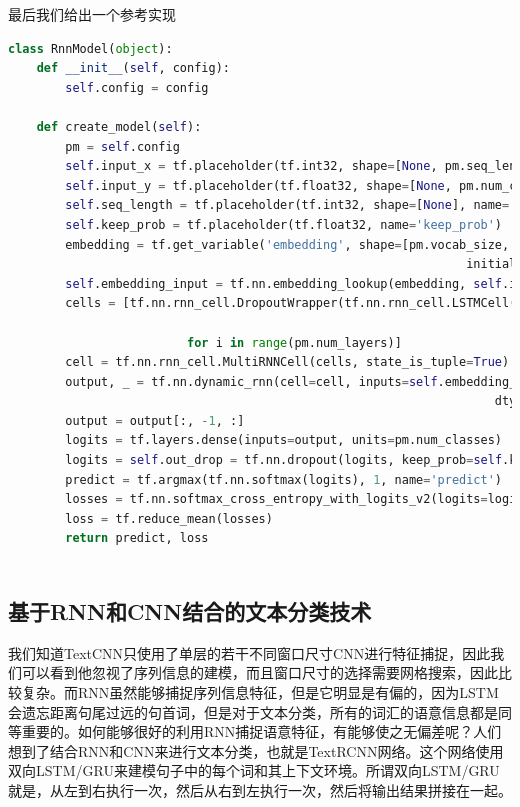 \documentclass[twoside,a4paper,12pt]{book}%
\begin{document}
最后我们给出一个参考实现
\begin{lstlisting}[language={python}]
class RnnModel(object):
	def __init__(self, config):
		self.config = config

	def create_model(self):
		pm = self.config
		self.input_x = tf.placeholder(tf.int32, shape=[None, pm.seq_length], name='input_x')
		self.input_y = tf.placeholder(tf.float32, shape=[None, pm.num_classes], name='input_y')
		self.seq_length = tf.placeholder(tf.int32, shape=[None], name='sequen_length')
		self.keep_prob = tf.placeholder(tf.float32, name='keep_prob')
		embedding = tf.get_variable('embedding', shape=[pm.vocab_size, pm.embedding_dim],
																initializer=tf.constant_initializer(pm.pre_trianing))
		self.embedding_input = tf.nn.embedding_lookup(embedding, self.input_x)
		cells = [tf.nn.rnn_cell.DropoutWrapper(tf.nn.rnn_cell.LSTMCell(num_units=pm.hidden_dim,name='cell-'+str(i)),
																					 output_keep_prob=self.keep_prob)
						 for i in range(pm.num_layers)]
		cell = tf.nn.rnn_cell.MultiRNNCell(cells, state_is_tuple=True)
		output, _ = tf.nn.dynamic_rnn(cell=cell, inputs=self.embedding_input, sequence_length=self.seq_length,
																	dtype=tf.float32)
		output = output[:, -1, :]
		logits = tf.layers.dense(inputs=output, units=pm.num_classes)
		logits = self.out_drop = tf.nn.dropout(logits, keep_prob=self.keep_prob)
		predict = tf.argmax(tf.nn.softmax(logits), 1, name='predict')
		losses = tf.nn.softmax_cross_entropy_with_logits_v2(logits=logits, labels=self.input_y)
		loss = tf.reduce_mean(losses)
		return predict, loss
	
\end{lstlisting}

\subsection{基于RNN和CNN结合的文本分类技术}
我们知道TextCNN只使用了单层的若干不同窗口尺寸\gls{CNN}进行特征捕捉，因此我们可以看到他忽视了序列信息的建模，而且窗口尺寸的选择需要网格搜索，因此比较复杂。而\gls{RNN}虽然能够捕捉序列信息特征，但是它明显是有偏的，因为\gls{LSTM}会遗忘距离句尾过远的句首词，但是对于文本分类，所有的词汇的语意信息都是同等重要的。如何能够很好的利用\gls{RNN}捕捉语意特征，有能够使之无偏差呢？人们想到了结合\gls{RNN}和\gls{CNN}来进行文本分类，也就是TextRCNN网络。这个网络使用双向\gls{LSTM}/\gls{GRU}来建模句子中的每个词和其上下文环境。所谓双向\gls{LSTM}/\gls{GRU} 就是，从左到右执行一次，然后从右到左执行一次，然后将输出结果拼接在一起。
\end{document}
